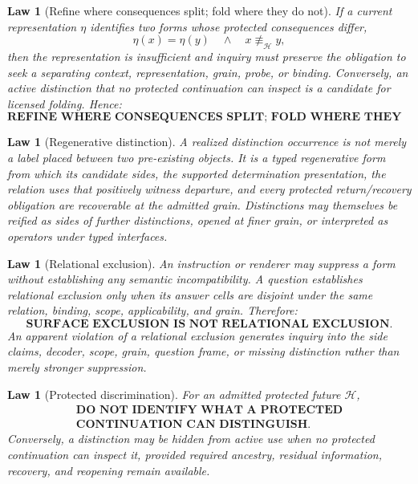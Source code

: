 \documentclass[11pt,oneside]{article}
\newtheorem{law}[definition]{Law}
\begin{document}
\begin{law}[Refine where consequences split; fold where they do not]
If a current representation \(\eta\) identifies two forms whose protected consequences differ,
\[
\eta(x)=\eta(y)
\quad\land\quad
x\not\equiv_{\mathcal H}y,
\]
then the representation is insufficient and inquiry must preserve the obligation to seek a separating context, representation, grain, probe, or binding.  Conversely, an active distinction that no protected continuation can inspect is a candidate for licensed folding.  Hence:
\[
\boxed{\textbf{REFINE WHERE CONSEQUENCES SPLIT; FOLD WHERE THEY DO NOT.}}
\]
\end{law}

\begin{law}[Regenerative distinction]
A realized distinction occurrence is not merely a label placed between two pre-existing objects.  It is a typed regenerative form from which its candidate sides, the supported determination presentation, the relation uses that positively witness departure, and every protected return/recovery obligation are recoverable at the admitted grain.  Distinctions may themselves be reified as sides of further distinctions, opened at finer grain, or interpreted as operators under typed interfaces.
\end{law}

\begin{law}[Relational exclusion]
An instruction or renderer may suppress a form without establishing any semantic incompatibility.  A question establishes relational exclusion only when its answer cells are disjoint under the same relation, binding, scope, applicability, and grain.  Therefore:
\[
\boxed{\textbf{SURFACE EXCLUSION IS NOT RELATIONAL EXCLUSION.}}
\]
An apparent violation of a relational exclusion generates inquiry into the side claims, decoder, scope, grain, question frame, or missing distinction rather than merely stronger suppression.
\end{law}

\begin{law}[Protected discrimination]
For an admitted protected future \(\mathcal H\),
\[
\boxed{
\begin{gathered}
\textbf{DO NOT IDENTIFY WHAT A PROTECTED}\\
\textbf{CONTINUATION CAN DISTINGUISH.}
\end{gathered}
}
\]
Conversely, a distinction may be hidden from active use when no protected continuation can inspect it, provided required ancestry, residual information, recovery, and reopening remain available.
\end{law}
\end{document}
